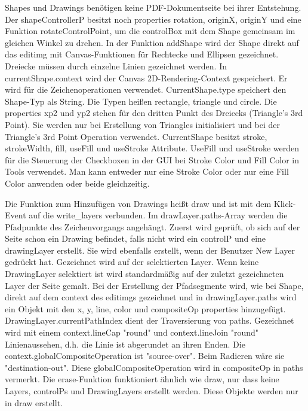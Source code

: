 \par
Shapes und Drawings benötigen keine PDF-Dokumentseite bei ihrer Entstehung. Der shapeControllerP besitzt noch properties rotation, originX, originY und eine Funktion rotateControlPoint, um die controlBox mit dem Shape gemeinsam im gleichen Winkel zu drehen. In der Funktion addShape wird der Shape direkt auf das editimg mit Canvas-Funktionen für Rechtecke und Ellipsen gezeichnet. Dreiecke müssen durch einzelne Linien gezeichnet werden. In currentShape.context wird der Canvas 2D-Rendering-Context gespeichert. Er wird für die Zeichenoperationen verwendet. CurrentShape.type speichert den Shape-Typ als String. Die Typen heißen rectangle, triangle und circle. Die properties xp2 und yp2 stehen für den dritten Punkt des Dreiecks (Triangle's 3rd Point). Sie werden nur bei Erstellung von Triangles initialisiert und bei der Triangle's 3rd Point Operation verwendet. CurrentShape besitzt stroke, strokeWidth, fill, useFill und useStroke Attribute. UseFill und useStroke werden für die Steuerung der Checkboxen in der GUI bei Stroke Color und Fill Color in Tools verwendet. Man kann entweder nur eine Stroke Color oder nur eine Fill Color anwenden oder beide gleichzeitig. 
\par 
Die Funktion zum Hinzufügen von Drawings heißt draw und ist mit dem Klick-Event auf die write\_layers verbunden. Im drawLayer.paths-Array werden die Pfadpunkte des Zeichenvorgangs angehängt. Zuerst wird geprüft, ob sich auf der Seite schon ein Drawing befindet, falls nicht wird ein controlP und eine drawingLayer erstellt. Sie wird ebenfalls erstellt, wenn der Benutzer New Layer gedrückt hat. Gezeichnet wird auf der selektierten Layer. Wenn keine DrawingLayer selektiert ist wird standardmäßig auf der zuletzt gezeichneten Layer der Seite gemalt. Bei der Erstellung der Pfadsegmente wird, wie bei Shape, direkt auf dem context des editimgs gezeichnet und in drawingLayer.paths wird ein Objekt mit den x, y, line, color und compositeOp properties hinzugefügt. DrawingLayer.currentPathIndex dient der Traversierung von paths. Gezeichnet wird mit einem context.lineCap "round" und context.lineJoin "round" Linienaussehen, d.h. die Linie ist abgerundet an ihren Enden. Die context.globalCompositeOperation ist "source-over". Beim Radieren wäre sie "destination-out". Diese globalCompositeOperation wird in compositeOp in paths vermerkt. Die erase-Funktion funktioniert ähnlich wie draw, nur dass keine Layers, controlPs und DrawingLayers erstellt werden. Diese Objekte werden nur in draw erstellt.


